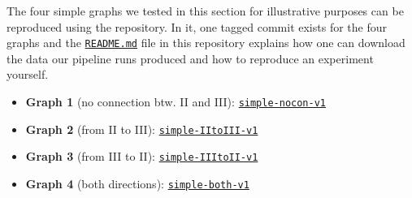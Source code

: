 \begin{tcolorbox}[title=\faIcon{recycle} Reproducibility, parbox=false]
    The four simple graphs we tested in this section for illustrative purposes can be reproduced using the  repository. In it, one tagged commit exists for the four graphs and the \href{https://github.com/rmnldwg/lynference#readme}{ \texttt{README.md}} file in this repository explains how one can download the data our pipeline runs produced and how to reproduce an experiment yourself.

    \begin{itemize}
        \item \textbf{Graph 1} (no connection btw. II and III): \href{https://github.com/rmnldwg/lynference/releases/tag/simple-nocon-v1}{ \texttt{simple-nocon-v1}}
        \item \textbf{Graph 2} (from II to III): \href{https://github.com/rmnldwg/lynference/releases/tag/simple-IItoIII-v1}{ \texttt{simple-IItoIII-v1}}
        \item \textbf{Graph 3} (from III to II): \href{https://github.com/rmnldwg/lynference/releases/tag/simple-IIItoII-v1}{ \texttt{simple-IIItoII-v1}}
        \item \textbf{Graph 4} (both directions): \href{https://github.com/rmnldwg/lynference/releases/tag/simple-both-v1}{ \texttt{simple-both-v1}}
    \end{itemize}
\end{tcolorbox}